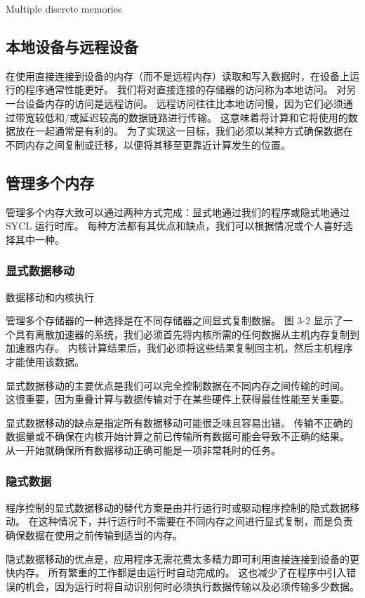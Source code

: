 {\color{red} Multiple discrete memories }

\subsection{本地设备与远程设备}
在使用直接连接到设备的内存（而不是远程内存）读取和写入数据时，在设备上运行的程序通常性能更好。 
我们将对直接连接的存储器的访问称为本地访问。 对另一台设备内存的访问是远程访问。 
远程访问往往比本地访问慢，因为它们必须通过带宽较低和/或延迟较高的数据链路进行传输。 
这意味着将计算和它将使用的数据放在一起通常是有利的。 
为了实现这一目标，我们必须以某种方式确保数据在不同内存之间复制或迁移，以便将其移至更靠近计算发生的位置。

\subsection{管理多个内存}
管理多个内存大致可以通过两种方式完成：显式地通过我们的程序或隐式地通过 SYCL 运行时库。 
每种方法都有其优点和缺点，我们可以根据情况或个人喜好选择其中一种。

\subsubsection{显式数据移动}
{\color{red} 数据移动和内核执行 }

管理多个存储器的一种选择是在不同存储器之间显式复制数据。 
图 3-2 显示了一个具有离散加速器的系统，我们必须首先将内核所需的任何数据从主机内存复制到加速器内存。 
内核计算结果后，我们必须将这些结果复制回主机，然后主机程序才能使用该数据。

显式数据移动的主要优点是我们可以完全控制数据在不同内存之间传输的时间。 
这很重要，因为重叠计算与数据传输对于在某些硬件上获得最佳性能至关重要。

显式数据移动的缺点是指定所有数据移动可能很乏味且容易出错。 
传输不正确的数据量或不确保在内核开始计算之前已传输所有数据可能会导致不正确的结果。 
从一开始就确保所有数据移动正确可能是一项非常耗时的任务。

\subsubsection{隐式数据}
程序控制的显式数据移动的替代方案是由并行运行时或驱动程序控制的隐式数据移动。 
在这种情况下，并行运行时不需要在不同内存之间进行显式复制，而是负责确保数据在使用之前传输到适当的内存。

隐式数据移动的优点是，应用程序无需花费太多精力即可利用直接连接到设备的更快内存。 
所有繁重的工作都是由运行时自动完成的。 
这也减少了在程序中引入错误的机会，因为运行时将自动识别何时必须执行数据传输以及必须传输多少数据。

